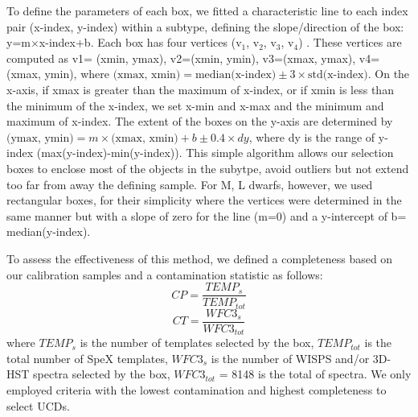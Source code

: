 \documentclass[manuscript]{aastex63}
\begin{document}
To define the parameters of each box, we fitted a characteristic line to each index pair (x-index, y-index) within a subtype, defining the slope/direction of the box: y=m$\times$x-index+b. Each box has four vertices (v$_1$, v$_2$, v$_3$, v$_4$) . These vertices are computed as v1= (xmin, ymax), v2=(xmin, ymin), v3=(xmax, ymax), v4=(xmax, ymin), where $\text{(xmax, xmin)}= \text{median(x-index)} \pm 3\times \text{std(x-index)}$. On the x-axis, if xmax is greater than the maximum of x-index, or if xmin is less than the minimum of the x-index, we set x-min and x-max and the minimum and maximum of x-index. The extent of the boxes on the y-axis are determined by $\text{(ymax, ymin)}= m \times \text{(xmax, xmin)} + b \pm 0.4 \times dy$, where dy is the range of y-index (max(y-index)-min(y-index)). This simple algorithm allows our selection boxes to enclose most of the objects in the subytpe, avoid outliers but not extend too far from away the defining sample. For M, L dwarfs, however, we used rectangular boxes, for their simplicity where the vertices were determined in the same manner but with a slope of zero for the line (m=0) and a y-intercept of b= median(y-index). 

To assess the effectiveness of this method, we defined a completeness based on our calibration samples and a contamination statistic as follows: 
 \begin{equation} CP=\frac{TEMP_s}{TEMP_{tot}} \end{equation}
\begin{equation} CT= \frac{WFC3_s}{WFC3_{tot}} \end{equation} where $TEMP_s$ is the number of templates selected by the box, $TEMP_{tot}$ is the total number of SpeX templates, $WFC3_s$ is the number of WISPS and/or 3D-HST spectra selected by the box, $WFC3_{tot}$ = 8148 is the total of spectra. We only employed criteria with the lowest contamination and highest completeness to select UCDs. 
\end{document}
